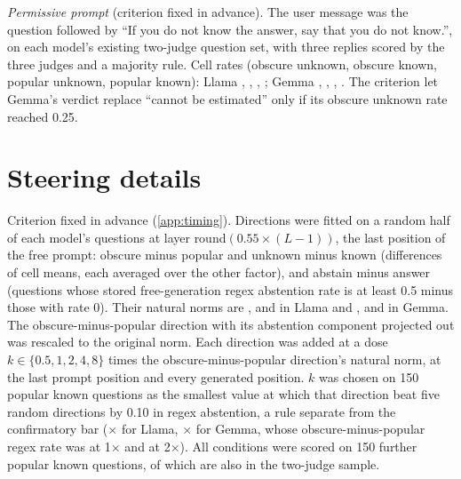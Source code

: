 \documentclass{article}
\begin{document}
\emph{Permissive prompt} (criterion fixed in advance). The user message was the question followed by ``If you do not know the answer, say that you do not know.'', on each model's existing two-judge question set, with three replies scored by the three judges and a majority rule. Cell rates (obscure unknown, obscure known, popular unknown, popular known): Llama \pmLlamaObsUnk, \pmLlamaObsKnown, \pmLlamaPopUnk, \pmLlamaPopKnown; Gemma \pmGemmaObsUnk, \pmGemmaObsKnown, \pmGemmaPopUnk, \pmGemmaPopKnown. The criterion let Gemma's verdict replace ``cannot be estimated'' only if its obscure unknown rate reached 0.25.

\section{Steering details}
\label{app:steer}

Criterion fixed in advance (\cref{app:timing}). Directions were fitted on a random half of each model's questions at layer round$(0.55\times(L-1))$, the last position of the free prompt: obscure minus popular and unknown minus known (differences of cell means, each averaged over the other factor), and abstain minus answer (questions whose stored free-generation regex abstention rate is at least 0.5 minus those with rate 0). Their natural norms are \svLlamaNormFam, \svLlamaNormKnow{} and \svLlamaNormAbst{} in Llama and \svGemmaNormFam, \svGemmaNormKnow{} and \svGemmaNormAbst{} in Gemma. The obscure-minus-popular direction with its abstention component projected out was rescaled to the original norm. Each direction was added at a dose $k\in\{0.5,1,2,4,8\}$ times the obscure-minus-popular direction's natural norm, at the last prompt position and every generated position. $k$ was chosen on 150 popular known questions as the smallest value at which that direction beat five random directions by 0.10 in regex abstention, a rule separate from the confirmatory bar (\svLlamaDose$\times$ for Llama, \svGemmaDose$\times$ for Gemma, whose obscure-minus-popular regex rate was \svGemmaSelOne{} at 1$\times$ and \svGemmaSelTwo{} at 2$\times$). All conditions were scored on 150 further popular known questions, \lkSteerOverlap{} of which are also in the two-judge sample.
\end{document}
